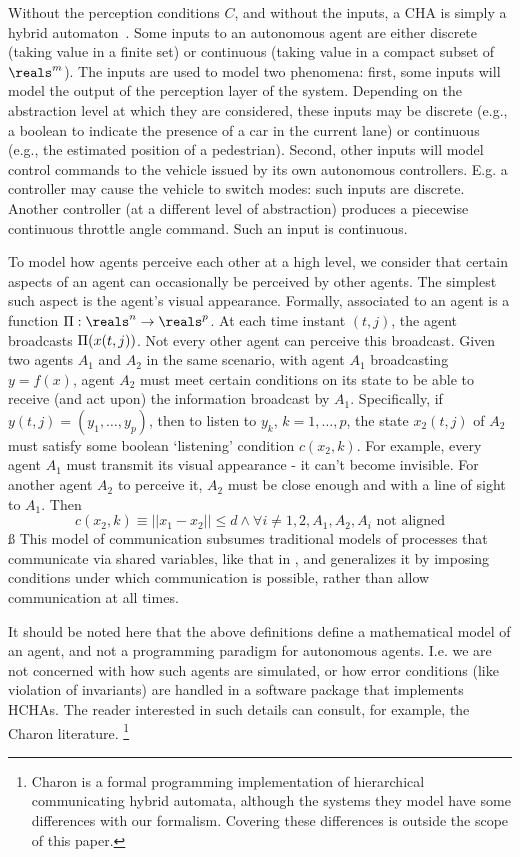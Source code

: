 Without the perception conditions $C$, and without the inputs, a CHA is simply a hybrid automaton~\cite{Henzinger96}.
Some inputs to an autonomous agent are either discrete (taking value in a finite set) or continuous (taking value in a compact subset of $\reals^m$).
The inputs are used to model two phenomena: 
first, some inputs will model the output of the perception layer of the system. 
Depending on the abstraction level at which they are considered, these inputs may be discrete (e.g., a boolean to indicate the presence of a car in the current lane) or continuous (e.g., the estimated position of a pedestrian).
Second, other inputs will model control commands to the vehicle issued by its own autonomous controllers. E.g. a controller may cause the vehicle to switch modes: such inputs are discrete. 
Another controller (at a different level of abstraction) produces a piecewise continuous throttle angle command. Such an input is continuous. 

To model how agents perceive each other at a high level, we consider that certain aspects of an agent can occasionally be perceived by other agents.
The simplest such aspect is the agent's visual appearance.
Formally, associated to an agent is a function $\funcOut:\reals^n \rightarrow \reals^p$.
At each time instant $(t,j)$, the agent broadcasts $\Pi(x(t,j))$.
Not every other agent can perceive this broadcast.
Given two agents $A_1$ and $A_2$ in the same scenario, with agent $A_1$ broadcasting $y = f(x)$, agent $A_2$ must meet certain conditions on its state to be able to receive (and act upon) the information broadcast by $A_1$.
Specifically, if $y(t,j) = (y_1,\ldots,y_p)$, then to listen to $y_k$, $k=1,\ldots,p$, the state $x_2(t,j)$ of $A_2$ must satisfy some boolean `listening' condition $c(x_2,k)$.
For example, every agent $A_1$ must transmit its visual appearance - it can't become invisible.
For another agent $A_2$ to perceive it, $A_2$ must be close enough and with a line of sight to $A_1$. 
Then 
\[c(x_2,k) \equiv ||x_1 - x_2 || \leq d \land \forall i\neq 1,2, A_1,A_2,A_i \text{ not aligned}\]
ß
This model of communication subsumes traditional models of processes that communicate via shared variables, like that in , and generalizes it by imposing conditions under which communication is possible, rather than allow communication at all times.

It should be noted here that the above definitions define a mathematical model of an agent, and not a programming paradigm for autonomous agents. 
I.e. we are not concerned with how such agents are simulated, or how error conditions (like violation of invariants) are handled in a software package that implements HCHAs.
The reader interested in such details can consult, for example, the Charon literature.
\footnote{Charon is a formal programming implementation of hierarchical communicating hybrid automata, although the systems they model have some differences with our formalism. Covering these differences is outside the scope of this paper.}

